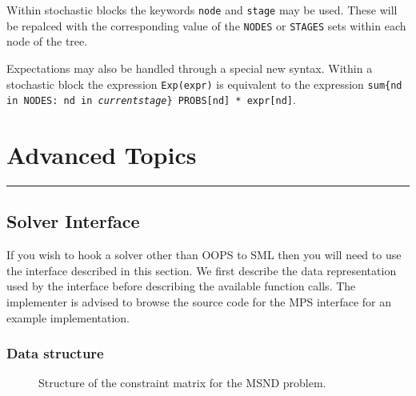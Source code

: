 \documentclass[10pt,a4paper]{book}
\begin{document}
\begin{verbtaim}
Within stochastic blocks the keywords {\tt node} and {\tt stage} may be used.
These will be repalced with the corresponding value of the {\tt NODES} or
{\tt STAGES} sets within each node of the tree.

Expectations may also be handled through a special new syntax. Within a
stochastic block the expression {\tt Exp(expr)} is equivalent to the expression
{\tt sum\{nd in NODES: nd in \textit{currentstage}\} PROBS[nd] * expr[nd]}.

\chapter{Advanced Topics}
\vspace{-0.6cm}\rule{\textwidth}{0.4ex}\vspace{0.1cm}

\section{Solver Interface}
\label{interface}

If you wish to hook a solver other than OOPS to SML then you will need to use
the interface described in this section. We first describe the data
representation used by the interface before describing the available function
calls. The implementer is advised to browse the source code for the MPS
interface for an example implementation.

\subsection{Data structure}
\begin{figure}
   \caption{ \label{Iface eg}
      Structure of the constraint matrix for the MSND problem.
   }
   \begin{center}
   \end{center}
\end{figure}


\end{verbtaim}
\end{document}
